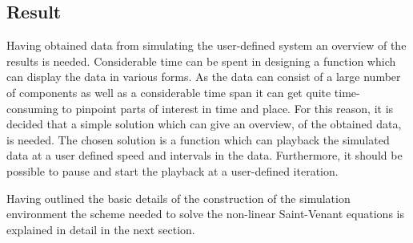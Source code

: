 \subsection*{Result}

Having obtained data from simulating the user-defined system an overview of the results is needed. Considerable time can be spent in designing a function which can display the data in various forms. As the data can consist of a large number of components as well as a considerable time span it can get quite time-consuming to pinpoint parts of interest in time and place. For this reason, it is decided that a simple solution which can give an overview, of the obtained data, is needed. The chosen solution is a function which can playback the simulated data at a user defined speed and intervals in the data. Furthermore, it should be possible to pause and start the playback at a user-defined iteration.    




Having outlined the basic details of the construction of the simulation environment the scheme needed to solve the non-linear Saint-Venant equations is explained in detail in the next section. 